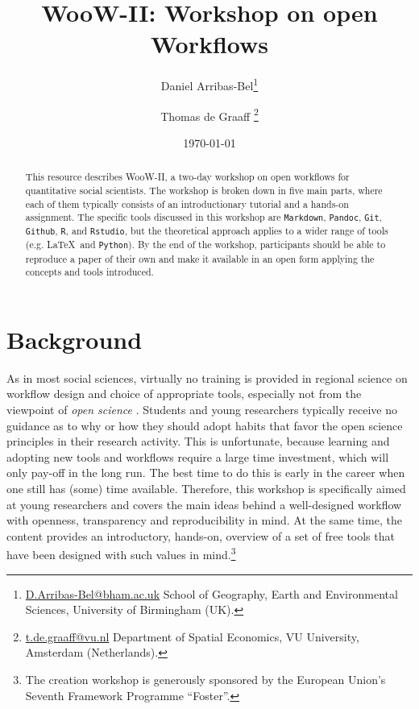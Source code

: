 \documentclass[11pt, a4paper]{article}
\title{WooW-II: Workshop on open Workflows}
\author{Daniel
Arribas-Bel\footnote{\href{mailto:D.Arribas-Bel@bham.ac.uk}{D.Arribas-Bel@bham.ac.uk}
School of Geography, Earth and Environmental Sciences, University of
Birmingham (UK).}
\and 
Thomas de Graaff
\footnote{\href{mailto:t.de.graaff@vu.nl}{t.de.graaff@vu.nl}
Department of Spatial Economics, VU University, Amsterdam (Netherlands).}}
\date{\today}
\begin{document}
\maketitle

\begin{abstract}
This resource describes WooW-II, a two-day workshop on open workflows for
quantitative social scientists. The workshop is broken down in five main
parts, where each of them typically consists of an introductionary tutorial and a
hands-on assignment. The specific tools discussed in this workshop are
\texttt{Markdown}, \texttt{Pandoc}, \texttt{Git}, \texttt{Github}, \texttt{R},
and \texttt{Rstudio}, but the theoretical approach applies to a wider range of
tools (e.g. \LaTeX \, and \texttt{Python}). By the end of the workshop,
participants should be able to reproduce a paper of their own and make it
available in an open form applying the concepts and tools introduced.
\end{abstract}

\section{Background}
\label{sec-1}

As in most social sciences, virtually no training is provided in regional
science on workflow design and choice of appropriate tools, especially not
from the viewpoint of \emph{open science} \citep{healy2011choosing,
arribas2014}. Students and young researchers
typically receive no guidance as to why or how they should adopt habits that
favor the open science principles in their research activity. This is
unfortunate, because learning and adopting new tools and workflows require a
large time investment, which will only pay-off in the long run. The best time
to do this is early in the career when one still has (some) time available.
Therefore, this workshop is specifically aimed at young researchers and covers
the main ideas behind a well-designed workflow with openness, transparency and
reproducibility in mind. At the same time, the content provides an
introductory, hands-on, overview of a
set of free tools that have been designed with such values in
mind.\footnote{The creation workshop is generously sponsored by the European
Union's Seventh Framework Programme ``Foster''.
 }
\end{document}
